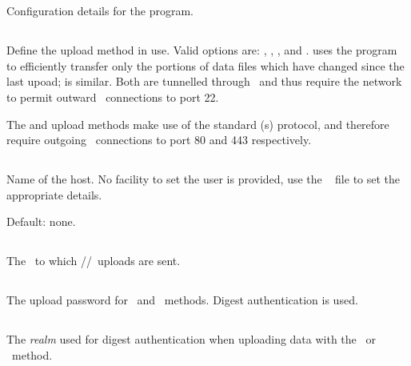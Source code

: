 
\section{\code{[upload]}}
Configuration details for the  program.

\subsection{}
Define the upload method in use. Valid options are: ,
, , and .  uses the
 program to efficiently transfer only the portions of
data files which have changed since the last upoad;  is
similar. Both are tunnelled through \ssh\ and thus require the network
to permit outward \tcp\ connections to port 22.

The  and  upload methods make use of the standard
\http(s) protocol, and therefore require outgoing \tcp\ connections to
port 80 and 443 respectively. 

\subsection{}
Name of the  host. No facility to set the user is
provided, use the \ssh\  file to set the
appropriate details.

Default: none.


\subsection{}
The \URL\ to which \http/\slash \https\ uploads are sent.

\subsection{}
The upload password for \http\ and \https\ methods. Digest
authentication is used.

\subsection{}
The \emph{realm} used for digest authentication when uploading data
with the \http\ or \https\ method.

